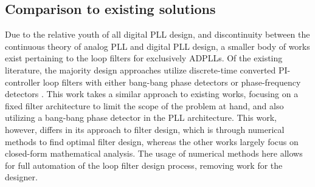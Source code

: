 


\FloatBarrier
\subsection{Comparison to existing solutions}
Due to the relative youth of all digital PLL design, and discontinuity between the continuous theory of analog PLL and digital PLL design, a smaller body of works exist pertaining to the loop filters for exclusively ADPLLs. Of the existing literature, the majority design approaches utilize discrete-time converted PI-controller loop filters with either bang-bang phase detectors \cite{kratyuk_2007}\cite{safwat_ghoneima_ismail_2011}\cite{zanuso_2009}\cite{xu_abidi_2017} or phase-frequency detectors \cite{kumm_klingbeil_zipf_2010}\cite{chau_chen_2009}. This work takes a similar approach to existing works, focusing on a fixed filter architecture to limit the scope of the problem at hand, and also utilizing a bang-bang phase detector in the PLL architecture. This work, however, differs in its approach to filter design, which is through numerical methods to find optimal filter design, whereas the other works largely focus on closed-form mathematical analysis. The usage of numerical methods here allows for full automation of the loop filter design process, removing work for the designer. 

